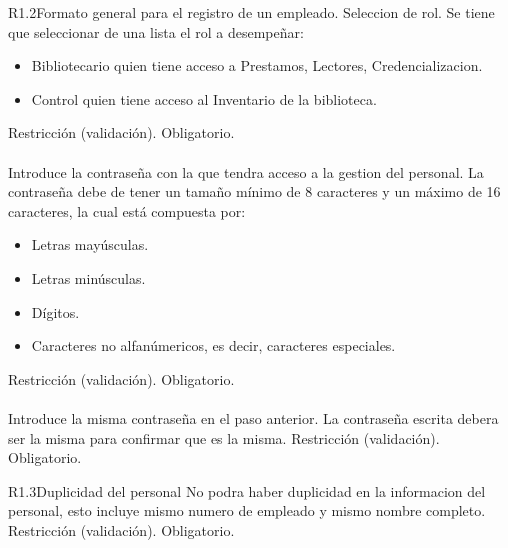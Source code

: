 \begin{BussinesRule}{R1.2}{Formato general para el registro de un empleado.}
	 Seleccion de rol.
	\BRitem[Descripción:] Se tiene que seleccionar de una lista el rol a desempeñar:
		\begin{itemize} 
			\item Bibliotecario quien tiene acceso a Prestamos, Lectores, Credencializacion.
			\item Control quien tiene acceso al Inventario de la biblioteca.
		\end{itemize}
	\BRitem[Tipo:] Restricción (validación).
	\BRitem[Nivel:] Obligatorio.\\\\

	\BRitem[Contraseña:] Introduce la contraseña con la que tendra acceso a la gestion del personal.
	\BRitem[Descripción:] La contraseña debe de tener un tamaño mínimo de 8 caracteres y un máximo de 16 caracteres, la cual está compuesta por:
		\begin{itemize}	
			\item Letras mayúsculas.
			\item Letras minúsculas.
			\item Dígitos.
			\item Caracteres no alfanúmericos, es decir, caracteres especiales.
		\end{itemize}
	\BRitem[Tipo:] Restricción (validación).
	\BRitem[Nivel:] Obligatorio.\\\\

	 Introduce la misma contraseña en el paso anterior.
	\BRitem[Descripción:] La contraseña escrita debera ser la misma para confirmar que es la misma.
	\BRitem[Tipo:] Restricción (validación).
	\BRitem[Nivel:] Obligatorio.

\end{BussinesRule}


\begin{BussinesRule}{R1.3}{Duplicidad del personal} 
	\BRitem[Descripción:] No podra haber duplicidad en la informacion del personal, esto incluye mismo numero de empleado y mismo nombre completo. 
	\BRitem[Tipo:] Restricción (validación).
	\BRitem[Nivel:] Obligatorio.
\end{BussinesRule}


